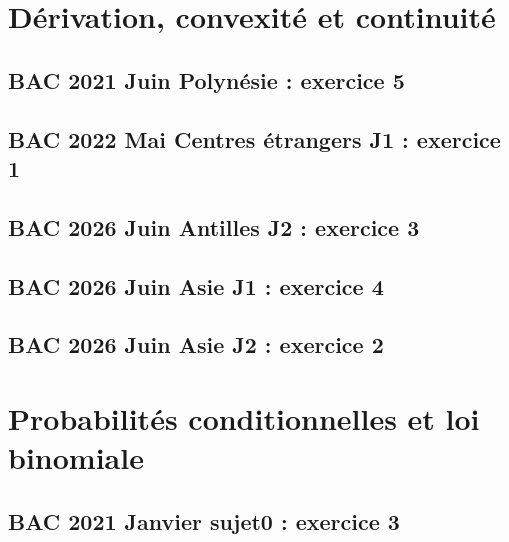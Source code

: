 \documentclass[lang=fr,edition=teacher,layout=sheet]{mxbook}
\begin{document}
\begingroup\endgroup
\par\bigskip
\clearpage\section*{Dérivation, convexité et continuité}
\subsection*{BAC 2021 Juin Polynésie : exercice 5}
\begingroup\endgroup
\par\bigskip
{}\subsection*{BAC 2022 Mai Centres étrangers J1 : exercice 1}
\begingroup\endgroup
\par\bigskip
{}\subsection*{BAC 2026 Juin Antilles J2 : exercice 3}
\begingroup\endgroup
\par\bigskip
{}\subsection*{BAC 2026 Juin Asie J1 : exercice 4}
\begingroup\endgroup
\par\bigskip
{}\subsection*{BAC 2026 Juin Asie J2 : exercice 2}
\begingroup\endgroup
\par\bigskip
\clearpage\section*{Probabilités conditionnelles et loi binomiale}
\subsection*{BAC 2021 Janvier sujet0 : exercice 3}
\end{document}
